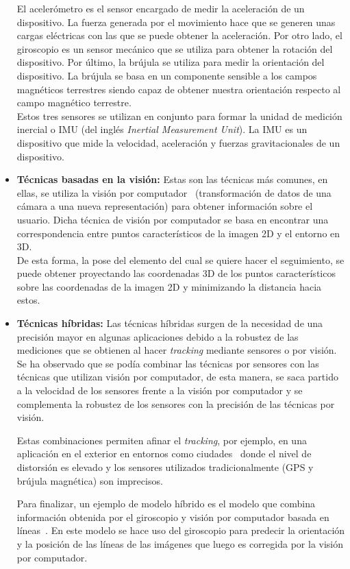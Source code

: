 \begin{itemize}
    El acelerómetro es el sensor encargado de medir la aceleración de un dispositivo. La fuerza generada por el movimiento hace que se generen unas cargas eléctricas con las que se puede obtener la aceleración. Por otro lado, el giroscopio es un sensor mecánico que se utiliza para obtener la rotación del dispositivo. Por último, la brújula se utiliza para medir la orientación del dispositivo. La brújula se basa en un componente sensible a los campos magnéticos terrestres siendo capaz de obtener nuestra orientación respecto al campo magnético terrestre.\\
    
    Estos tres sensores se utilizan en conjunto para formar la unidad de medición inercial o IMU (del inglés \textit{Inertial Measurement Unit}). La IMU es un dispositivo que mide la velocidad, aceleración y fuerzas gravitacionales de un dispositivo.
    
    \item \textbf{Técnicas basadas en la visión:} Estas son las técnicas más comunes, en ellas, se utiliza la visión por computador~\cite{visionporcomputador} (transformación de datos de una cámara a una nueva representación) para obtener información sobre el usuario. Dicha técnica de visión por computador se basa en encontrar una correspondencia entre puntos característicos de la imagen 2D y el entorno en 3D.\\ 
    
    De esta forma, la pose del elemento del cual se quiere hacer el seguimiento, se puede obtener proyectando las coordenadas 3D de los puntos característicos sobre las coordenadas de la imagen 2D y minimizando la distancia hacia estos.
    
    \item \textbf{Técnicas híbridas:} Las técnicas híbridas surgen de la necesidad de una precisión mayor en algunas aplicaciones debido a la robustez de las mediciones que se obtienen al hacer \textit{tracking} mediante sensores o por visión. Se ha observado que se podía combinar las técnicas por sensores con las técnicas que utilizan visión por computador, de esta manera, se saca partido a la velocidad de los sensores frente a la visión por computador y se complementa la robustez de los sensores con la precisión de las técnicas por visión. 
    
    Estas combinaciones permiten afinar el \textit{tracking}, por ejemplo, en una aplicación en el exterior en entornos como ciudades~\cite{hybridtrackingUrban} donde el nivel de distorsión es elevado y los sensores utilizados tradicionalmente (GPS y brújula magnética) son imprecisos.
    
    Para finalizar, un ejemplo de modelo híbrido es el modelo que combina información obtenida por el giroscopio y visión por computador basada en líneas~\cite{robustHybridmodel}. En este modelo se hace uso del giroscopio para predecir la orientación y la posición de las líneas de las imágenes que luego es corregida por la visión por computador.
    
\end{itemize}

